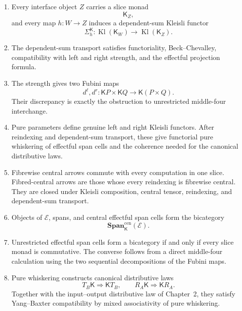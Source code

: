 \begin{enumerate}
    \item Every interface object \(Z\) carries a slice monad
    \[
        \mathsf K_Z,
    \]
    and every map \(h:W\to Z\) induces a dependent-sum Kleisli functor
    \[
        \Sigma_h^{\mathsf K}:
        \operatorname{Kl}(\mathsf K_W)
        \to
        \operatorname{Kl}(\mathsf K_Z).
    \]

    \item The dependent-sum transport satisfies functoriality,
    Beck--Chevalley, compatibility with left and right strength, and the
    effectful projection formula.

    \item The strength gives two Fubini maps
    \[
        d^\ell,d^r:
        \mathsf KP\times\mathsf KQ
        \to
        \mathsf K(P\times Q).
    \]
    Their discrepancy is exactly the obstruction to unrestricted
    middle-four interchange.

    \item Pure parameters define genuine left and right Kleisli functors.
    After reindexing and dependent-sum transport, these give functorial pure
    whiskering of effectful span cells and the coherence needed for the
    canonical distributive laws.

    \item Fibrewise central arrows commute with every computation in one
    slice.  Fibred-central arrows are those whose every reindexing is
    fibrewise central.  They are closed under Kleisli composition, central
    tensor, reindexing, and dependent-sum transport.

    \item Objects of \(\mathcal E\), spans, and central effectful span cells
    form the bicategory
    \[
        \mathbf{Span}^{\mathrm{cen}}_{\mathsf K}(\mathcal E).
    \]

    \item Unrestricted effectful span cells form a bicategory if and only if
    every slice monad is commutative.  The converse follows from a direct
    middle-four calculation using the two sequential decompositions of the
    Fubini maps.

    \item Pure whiskering constructs canonical distributive laws
    \[
        T_B\mathsf K\Rightarrow\mathsf KT_B,
        \qquad
        R_A\mathsf K\Rightarrow\mathsf KR_A.
    \]
    Together with the input--output distributive law of Chapter~2, they
    satisfy Yang--Baxter compatibility by mixed associativity of pure
    whiskering.


\end{enumerate}
